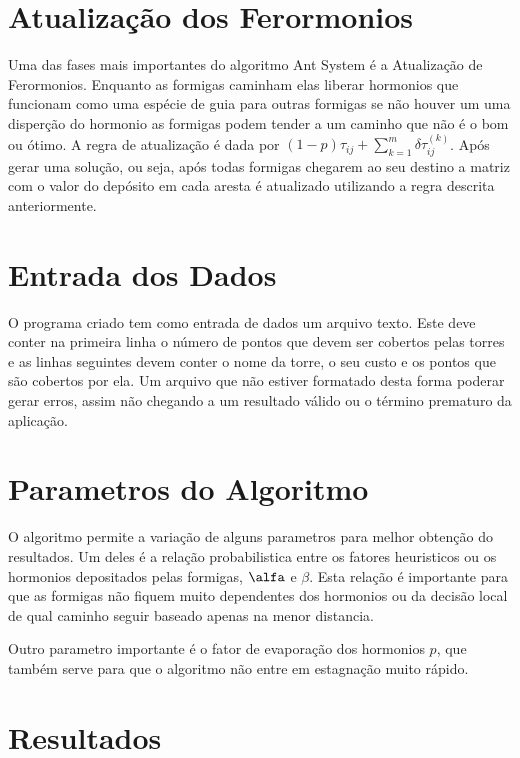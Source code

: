 \documentclass[12pt]{article}
\begin{document}
\section{Atualização dos Ferormonios}

Uma das fases mais importantes do algoritmo Ant System é a Atualização
de Ferormonios. Enquanto as formigas caminham elas liberar hormonios que funcionam
como uma espécie de guia para outras formigas se não houver um uma disperção do hormonio
as formigas podem tender a um caminho que não é o bom ou ótimo. A regra de atualização
é dada por $(1-p)\tau_{ij} + \sum_{k=1}^{m}\delta\tau_{ij}^{(k)}$. Após gerar uma
solução, ou seja, após todas formigas chegarem ao seu destino a matriz com 
o valor do depósito em cada aresta é atualizado utilizando a regra descrita anteriormente.

\section{Entrada dos Dados}

O programa criado tem como entrada de dados um arquivo texto. 
Este deve conter na primeira linha o número de pontos que devem ser cobertos pelas torres e
as linhas seguintes devem conter o nome da torre, o seu custo e os pontos que
são cobertos por ela. Um arquivo que não estiver formatado desta forma poderar
gerar erros, assim não chegando a um resultado válido ou o término prematuro da
aplicação.

\section{Parametros do Algoritmo}

O algoritmo permite a variação de alguns parametros para melhor obtenção do resultados.
Um deles é a relação probabilistica entre os fatores heuristicos ou os hormonios depositados
pelas formigas, $\alfa$ e $\beta$. Esta relação é importante para que as formigas não fiquem
muito dependentes dos hormonios ou da decisão local de qual caminho seguir baseado
apenas na menor distancia.

Outro parametro importante é o fator de evaporação dos hormonios $p$, que também serve
para que o algoritmo não entre em estagnação muito rápido.

\section{Resultados}
\end{document}
